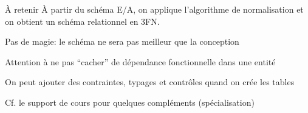 \begin{frame}{À retenir}
À partir du schéma E/A, on applique l'algorithme de normalisation et on obtient
un schéma relationnel en 3FN.

\vfill

\begin{redbullet}
   \item Pas de magie: le schéma ne sera pas meilleur que la conception
   \item Attention à ne pas ``cacher''  de dépendance fonctionnelle dans une entité
   \item On peut ajouter des contraintes, typages et contrôles quand on crée les tables
\end{redbullet}

\vfill

Cf. le support de cours pour quelques compléments (spécialisation)
\end{frame}

